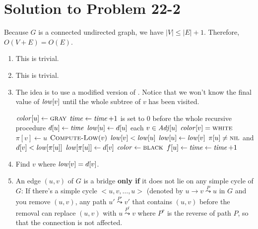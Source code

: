 \documentclass[a4paper, fleqn]{article}
\begin{document}
\section*{Solution to Problem 22-2}

Because $G$ is a connected undirected graph, we have $|V| \leq |E| + 1$. Therefore, $O(V + E) = O(E)$.

\begin{enumerate}[label=\itshape \bfseries \alph{enumi}]
\renewcommand{\labelenumi}{\itshape \bfseries \alph{enumi}.}

\item  %

This is trivial.

\item  %

This is trivial.

\item  %

The idea is to use a modified version of . Notice that we won't know the final value of $\id{low}[v]$ until the whole subtree of $v$ has been visited.

\begin{codebox}
\li $\id{color}[u] \gets \const{gray}$
\li $\id{time} \gets \id{time} + 1$ \>\>\>\>\> \Comment {} is set to 0 before the whole recursive procedure
\li $d[u] \gets \id{time}$
\li $\id{low}[u] \gets d[u]$
\li \For each $v \in \id{Adj}[u]$
\li   \Do
        \If $\id{color}[v] = \const{white}$
\li       \Then
            $\pi[v] \gets u$
\li         $\textnormal{\scshape Compute-Low}(v)$
\li         \If $\id{low}[v] < \id{low}[u]$
\li           \Then
                $\id{low}[u] \gets \id{low}[v]$
              \End
\li       \ElseIf $\pi[u] \neq \textnormal{\scshape nil}$ and $d[v] < \id{low}[\pi[u]]$
\li         \Then
              $\id{low}[\pi[u]] \gets d[v]$
            \End
          \End
      \End
\li $\id{color} \gets \const{black}$
\li $f[u] \gets \id{time} \gets \id{time} + 1$
\end{codebox}

\item  %

Find $v$ where $\id{low}[v] = d[v]$.

\item\label{problem_22_2:e}  %

An edge $(u, v)$ of $G$ is a bridge \textbf{only if} it does not lie on any simple cycle of $G$: If there's a simple cycle $<u, v, \ldots, u>$ (denoted by $u \to v \stackrel{P}{\leadsto} u$ in $G$ and you remove $(u, v)$, any path $u' \stackrel{P'}{\leadsto} v'$ that contains $(u, v)$ before the removal can replace $(u, v)$ with $u \stackrel{P^{r}}{\leadsto} v$ where $P^{r}$ is the reverse of path $P$, so that the connection is not affected.


\end{enumerate}
\end{document}
